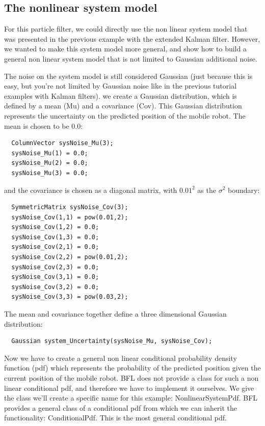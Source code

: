 \documentclass[a4paper,10pt]{report}
\begin{document}
\subsection{The nonlinear system model}
For this particle filter, we could directly use the non linear system
model that was presented in the previous example with the extended
Kalman filter. However, we wanted to make this system model more
general, and show how to build a general non linear system model that
is not limited to Gaussian additional noise.

The noise on the system model is still considered Gaussian (just
because this is easy, but you're not limited by Gaussian noise like in
the previous tutorial examples with Kalman filters). we create a
Gaussian distribution, which is defined by a mean (Mu) and a
covariance (Cov).  This Gaussian distribution represents the
uncertainty on the predicted position of the mobile robot. The mean is
chosen to be $0.0$:
\begin{verbatim}
  ColumnVector sysNoise_Mu(3);
  sysNoise_Mu(1) = 0.0;
  sysNoise_Mu(2) = 0.0;
  sysNoise_Mu(3) = 0.0;
\end{verbatim}
and the covariance is chosen as a diagonal matrix, with $0.01^2$ as the
$\sigma^2$ boundary:
\begin{verbatim}
  SymmetricMatrix sysNoise_Cov(3);
  sysNoise_Cov(1,1) = pow(0.01,2);
  sysNoise_Cov(1,2) = 0.0;
  sysNoise_Cov(1,3) = 0.0;
  sysNoise_Cov(2,1) = 0.0;
  sysNoise_Cov(2,2) = pow(0.01,2);
  sysNoise_Cov(2,3) = 0.0;
  sysNoise_Cov(3,1) = 0.0;
  sysNoise_Cov(3,2) = 0.0;
  sysNoise_Cov(3,3) = pow(0.03,2);
\end{verbatim}
The mean and covariance together define a three dimensional Gaussian
distribution:
\begin{verbatim}
  Gaussian system_Uncertainty(sysNoise_Mu, sysNoise_Cov);
\end{verbatim}

Now we have to create a general non linear conditional probability
density function (pdf) which represents the probability of the
predicted position given the current position of the mobile robot. BFL
does not provide a class for such a non linear conditional pdf, and
therefore we have to implement it ourselves.  We give the class we'll
create a specific name for this example: NonlinearSystemPdf.  BFL
provides a general class of a conditional pdf from which we can
inherit the functionality: ConditionalPdf. This is the most general
conditional pdf.
\end{document}
